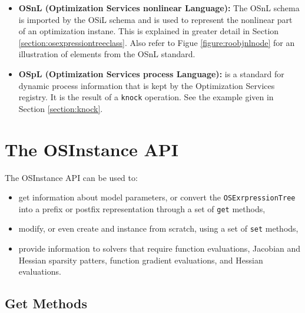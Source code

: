 \documentclass[11pt]{article}
\newcounter{Fig}
\renewcommand{\_}{{\char"5F}}
\renewcommand{\{}{{\char"7B}}
\renewcommand{\}}{{\char"7D}}
\renewcommand{\^}{{\char"0D}}
\renewcommand{\'}{{\char"0D}}
\begin{document}
\begin{itemize}
\item[] {\bf OSnL (Optimization Services nonlinear Language):}  The OSnL schema is imported by the OSiL schema and is used to represent the nonlinear part of an optimization instane. This is explained in greater detail in Section \ref{section:osexpressiontreeclass}. Also refer to Figue \ref{figure:roobjnlnode} for an illustration of elements from the OSnL standard. 



\item[]   {\bf OSpL (Optimization Services process Language):} is a standard for dynamic process information that is kept by the Optimization Services registry. 
It is the result of a {\tt knock} operation. See the example given in Section \ref{section:knock}.

\end{itemize}



\section{The  OSInstance API}\label{section:osinstanceAPI}

The OSInstance API can be used to:

\begin{itemize}

\item  get information about model parameters, or convert the {\tt OSExrpressionTree} into a prefix or postfix representation through a set of {\tt get} methods,

\item modify, or even create and instance from scratch, using a set of {\tt set} methods,

\item provide information to solvers that require function evaluations, Jacobian and Hessian sparsity patters,  function gradient evaluations, and Hessian evaluations. 

\end{itemize}



\subsection{Get Methods}
\end{document}
